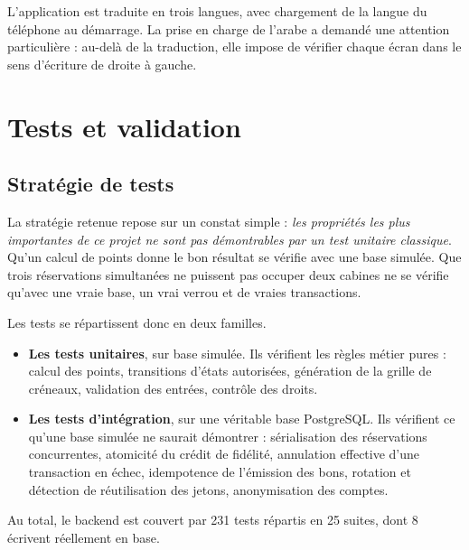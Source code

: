 L'application est traduite en trois langues, avec chargement de la langue du
téléphone au démarrage. La prise en charge de l'arabe a demandé une attention
particulière : au-delà de la traduction, elle impose de vérifier chaque écran
dans le sens d'écriture de droite à gauche.

\section{Tests et validation}

\subsection{Stratégie de tests}

La stratégie retenue repose sur un constat simple : \emph{les propriétés les
plus importantes de ce projet ne sont pas démontrables par un test unitaire
classique}. Qu'un calcul de points donne le bon résultat se vérifie avec une
base simulée. Que trois réservations simultanées ne puissent pas occuper deux
cabines ne se vérifie qu'avec une vraie base, un vrai verrou et de vraies
transactions.

Les tests se répartissent donc en deux familles.

\begin{itemize}[leftmargin=1.2cm]
  \item \textbf{Les tests unitaires}, sur base simulée. Ils vérifient les
  règles métier pures : calcul des points, transitions d'états autorisées,
  génération de la grille de créneaux, validation des entrées, contrôle des
  droits.

  \item \textbf{Les tests d'intégration}, sur une véritable base PostgreSQL.
  Ils vérifient ce qu'une base simulée ne saurait démontrer : sérialisation des
  réservations concurrentes, atomicité du crédit de fidélité, annulation
  effective d'une transaction en échec, idempotence de l'émission des bons,
  rotation et détection de réutilisation des jetons, anonymisation des comptes.
\end{itemize}

Au total, le backend est couvert par 231 tests répartis en 25 suites, dont 8
écrivent réellement en base.

